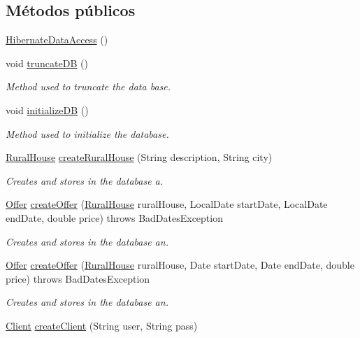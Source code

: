 \subsection*{Métodos públicos}
\begin{DoxyCompactItemize}
\item 
\mbox{\hyperlink{a00144_a8e0ec929d78d37a992837db0ba7e9602}{Hibernate\+Data\+Access}} ()
\item 
void \mbox{\hyperlink{a00144_a81a5e60db58acfc1a3c1de2f014813d5}{truncate\+DB}} ()
\begin{DoxyCompactList}\small\item\em Method used to truncate the data base. \end{DoxyCompactList}\item 
void \mbox{\hyperlink{a00144_af6f8016d5e185e86519871913781fe73}{initialize\+DB}} ()
\begin{DoxyCompactList}\small\item\em Method used to initialize the database. \end{DoxyCompactList}\item 
\mbox{\hyperlink{a00188}{Rural\+House}} \mbox{\hyperlink{a00144_a23eafc2c1f43052f2005a863d6592abc}{create\+Rural\+House}} (String description, String city)
\begin{DoxyCompactList}\small\item\em Creates and stores in the database a. \end{DoxyCompactList}\item 
\mbox{\hyperlink{a00184}{Offer}} \mbox{\hyperlink{a00144_a332f591a06df13d36814ff215008987b}{create\+Offer}} (\mbox{\hyperlink{a00188}{Rural\+House}} rural\+House, Local\+Date start\+Date, Local\+Date end\+Date, double price)  throws Bad\+Dates\+Exception 
\begin{DoxyCompactList}\small\item\em Creates and stores in the database an. \end{DoxyCompactList}\item 
\mbox{\hyperlink{a00184}{Offer}} \mbox{\hyperlink{a00144_aeff0125a8998d3f3529028592a13efb0}{create\+Offer}} (\mbox{\hyperlink{a00188}{Rural\+House}} rural\+House, Date start\+Date, Date end\+Date, double price)  throws Bad\+Dates\+Exception 
\begin{DoxyCompactList}\small\item\em Creates and stores in the database an. \end{DoxyCompactList}\item 
\mbox{\hyperlink{a00164}{Client}} \mbox{\hyperlink{a00144_ab1113c4a35f6f888d6bee15f25b117d5}{create\+Client}} (String user, String pass)

\end{DoxyCompactItemize}
